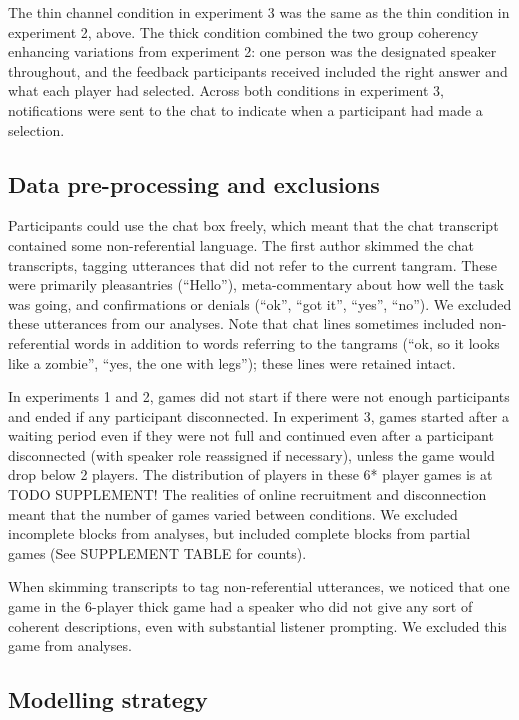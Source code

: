 \documentclass[
  english,
  a4paper,
]{article}
\begin{document}
The thin channel condition in experiment 3 was the same as the thin condition in experiment 2, above. The thick condition combined the two group coherency enhancing variations from experiment 2: one person was the designated speaker throughout, and the feedback participants received included the right answer and what each player had selected. Across both conditions in experiment 3, notifications were sent to the chat to indicate when a participant had made a selection.

\hypertarget{data-pre-processing-and-exclusions}{%
\subsection{Data pre-processing and exclusions}\label{data-pre-processing-and-exclusions}}

Participants could use the chat box freely, which meant that the chat transcript contained some non-referential language. The first author skimmed the chat transcripts, tagging utterances that did not refer to the current tangram. These were primarily pleasantries (``Hello''), meta-commentary about how well the task was going, and confirmations or denials (``ok'', ``got it'', ``yes'', ``no''). We excluded these utterances from our analyses. Note that chat lines sometimes included non-referential words in addition to words referring to the tangrams (``ok, so it looks like a zombie'', ``yes, the one with legs''); these lines were retained intact.

In experiments 1 and 2, games did not start if there were not enough participants and ended if any participant disconnected. In experiment 3, games started after a waiting period even if they were not full and continued even after a participant disconnected (with speaker role reassigned if necessary), unless the game would drop below 2 players. The distribution of players in these 6* player games is at TODO SUPPLEMENT! The realities of online recruitment and disconnection meant that the number of games varied between conditions. We excluded incomplete blocks from analyses, but included complete blocks from partial games (See SUPPLEMENT TABLE for counts).

When skimming transcripts to tag non-referential utterances, we noticed that one game in the 6-player thick game had a speaker who did not give any sort of coherent descriptions, even with substantial listener prompting. We excluded this game from analyses.

\hypertarget{modelling-strategy}{%
\subsection{Modelling strategy}\label{modelling-strategy}}
\end{document}
